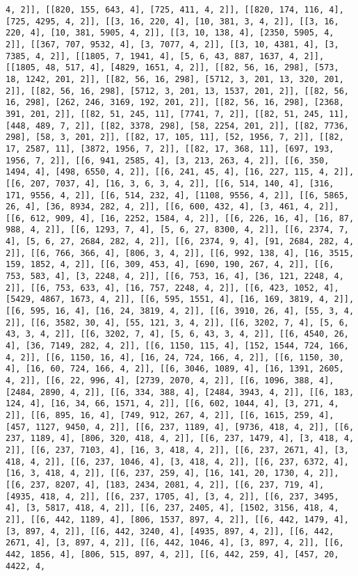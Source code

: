 \documentclass[12pt,fleqn]{article}\usepackage{../../common}
\begin{document}
\begin{verbatim}
4, 2]], [[820, 155, 643, 4], [725, 411, 4, 2]], [[820, 174, 116, 4], [725, 4295, 4, 2]], [[3, 16, 220, 4], [10, 381, 3, 4, 2]], [[3, 16, 220, 4], [10, 381, 5905, 4, 2]], [[3, 10, 138, 4], [2350, 5905, 4, 2]], [[367, 707, 9532, 4], [3, 7077, 4, 2]], [[3, 10, 4381, 4], [3, 7385, 4, 2]], [[1805, 7, 1941, 4], [5, 6, 43, 887, 1637, 4, 2]], [[1805, 48, 517, 4], [4829, 1651, 4, 2]], [[82, 56, 16, 298], [573, 18, 1242, 201, 2]], [[82, 56, 16, 298], [5712, 3, 201, 13, 320, 201, 2]], [[82, 56, 16, 298], [5712, 3, 201, 13, 1537, 201, 2]], [[82, 56, 16, 298], [262, 246, 3169, 192, 201, 2]], [[82, 56, 16, 298], [2368, 391, 201, 2]], [[82, 51, 245, 11], [7741, 7, 2]], [[82, 51, 245, 11], [448, 489, 7, 2]], [[82, 3378, 298], [58, 2254, 201, 2]], [[82, 7736, 298], [58, 3, 201, 2]], [[82, 17, 105, 11], [52, 1956, 7, 2]], [[82, 17, 2587, 11], [3872, 1956, 7, 2]], [[82, 17, 368, 11], [697, 193, 1956, 7, 2]], [[6, 941, 2585, 4], [3, 213, 263, 4, 2]], [[6, 350, 1494, 4], [498, 6550, 4, 2]], [[6, 241, 45, 4], [16, 227, 115, 4, 2]], [[6, 207, 7037, 4], [16, 3, 6, 3, 4, 2]], [[6, 514, 140, 4], [316, 171, 9556, 4, 2]], [[6, 514, 232, 4], [1108, 9556, 4, 2]], [[6, 5865, 26, 4], [36, 8934, 282, 4, 2]], [[6, 600, 432, 4], [3, 461, 4, 2]], [[6, 612, 909, 4], [16, 2252, 1584, 4, 2]], [[6, 226, 16, 4], [16, 87, 988, 4, 2]], [[6, 1293, 7, 4], [5, 6, 27, 8300, 4, 2]], [[6, 2374, 7, 4], [5, 6, 27, 2684, 282, 4, 2]], [[6, 2374, 9, 4], [91, 2684, 282, 4, 2]], [[6, 766, 366, 4], [806, 3, 4, 2]], [[6, 992, 138, 4], [16, 3515, 159, 1852, 4, 2]], [[6, 309, 453, 4], [690, 190, 267, 4, 2]], [[6, 753, 583, 4], [3, 2248, 4, 2]], [[6, 753, 16, 4], [36, 121, 2248, 4, 2]], [[6, 753, 633, 4], [16, 757, 2248, 4, 2]], [[6, 423, 1052, 4], [5429, 4867, 1673, 4, 2]], [[6, 595, 1551, 4], [16, 169, 3819, 4, 2]], [[6, 595, 16, 4], [16, 24, 3819, 4, 2]], [[6, 3910, 26, 4], [55, 3, 4, 2]], [[6, 3582, 30, 4], [55, 121, 3, 4, 2]], [[6, 3202, 7, 4], [5, 6, 43, 3, 4, 2]], [[6, 3202, 7, 4], [5, 6, 43, 3, 4, 2]], [[6, 4540, 26, 4], [36, 7149, 282, 4, 2]], [[6, 1150, 115, 4], [152, 1544, 724, 166, 4, 2]], [[6, 1150, 16, 4], [16, 24, 724, 166, 4, 2]], [[6, 1150, 30, 4], [16, 60, 724, 166, 4, 2]], [[6, 3046, 1089, 4], [16, 1391, 2605, 4, 2]], [[6, 22, 996, 4], [2739, 2070, 4, 2]], [[6, 1096, 388, 4], [2484, 2890, 4, 2]], [[6, 334, 388, 4], [2484, 3943, 4, 2]], [[6, 183, 124, 4], [16, 34, 66, 1571, 4, 2]], [[6, 602, 1044, 4], [3, 271, 4, 2]], [[6, 895, 16, 4], [749, 912, 267, 4, 2]], [[6, 1615, 259, 4], [457, 1127, 9450, 4, 2]], [[6, 237, 1189, 4], [9736, 418, 4, 2]], [[6, 237, 1189, 4], [806, 320, 418, 4, 2]], [[6, 237, 1479, 4], [3, 418, 4, 2]], [[6, 237, 7103, 4], [16, 3, 418, 4, 2]], [[6, 237, 2671, 4], [3, 418, 4, 2]], [[6, 237, 1046, 4], [3, 418, 4, 2]], [[6, 237, 6372, 4], [16, 3, 418, 4, 2]], [[6, 237, 259, 4], [16, 141, 20, 1730, 4, 2]], [[6, 237, 8207, 4], [183, 2434, 2081, 4, 2]], [[6, 237, 719, 4], [4935, 418, 4, 2]], [[6, 237, 1705, 4], [3, 4, 2]], [[6, 237, 3495, 4], [3, 5817, 418, 4, 2]], [[6, 237, 2405, 4], [1502, 3156, 418, 4, 2]], [[6, 442, 1189, 4], [806, 1537, 897, 4, 2]], [[6, 442, 1479, 4], [3, 897, 4, 2]], [[6, 442, 3240, 4], [4935, 897, 4, 2]], [[6, 442, 2671, 4], [3, 897, 4, 2]], [[6, 442, 1046, 4], [3, 897, 4, 2]], [[6, 442, 1856, 4], [806, 515, 897, 4, 2]], [[6, 442, 259, 4], [457, 20, 4422, 4, 
\end{verbatim}
\end{document}
